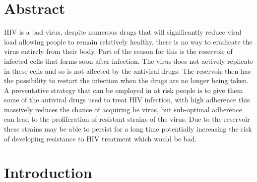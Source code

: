 \documentclass[DIV=15]{scrartcl}
\begin{document}
\section*{Abstract}
HIV is a bad  virus, despite numerous drugs that will significantly reduce viral load allowing people to remain relatively healthy, there is no way to eradicate the virus entirely from their body. Part of the reason for this is the reservoir of  infected cells that forms soon after infection. The virus does not actively replicate in these cells and so is not affected by the antiviral drugs. The reservoir then has the possibility to restart the infection when the drugs are no longer being taken. A preventative strategy that can be employed in at risk people is to give them some of the antiviral drugs used to treat HIV infection, with high adherence this massively reduces the chance of acquiring he virus, but sub-optimal adherence can lead to the proliferation  of resistant strains of the virus. Due to the reservoir these strains may be able to persist for a long time potentially increasing the risk of developing resistance  to HIV treatment which would be bad.

\section{Introduction}
\label{intro}


\end{document}
